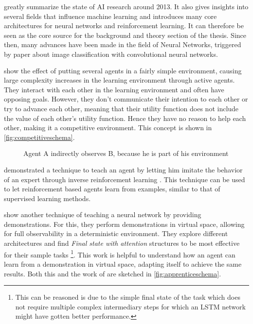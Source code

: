 \documentclass[12pt,a4paper]{article}
\begin{document}
\citeauthor{russell2016artificial} greatly summarize the state of AI research around 2013. It also gives insights into several fields that influence machine learning and introduces many core architectures for neural networks and reinforcement learning. It can therefore be seen as the core source for the background and theory section of the thesis. Since then, many advances have been made in the field of Neural Networks, triggered by \citeauthor{krizhevsky2012imagenet} paper about image classification with convolutional neural networks.

\citeauthor{bansal2017emergent} show the effect of putting several agents in a fairly simple environment, causing large complexity increases in the learning environment through active agents. They interact with each other in the learning environment and often have opposing goals. However, they don't communicate their intention to each other or try to advance each other, meaning that their utility function does not include the value of each other's utility function. Hence they have no reason to help each other, making it a competitive environment. This concept is shown in \autoref{fig:competitiveschema}.

\begin{figure}[H]
    \centering
    \caption{Agent A indirectly observes B, because he is part of his environment}
    \label{fig:competitiveschema}
\end{figure}



\citeauthor{NG2004Apprentice} demonstrated a technique to teach an agent by letting him imitate the behavior of an expert through inverse reinforcement learning \cite{NG2000InvReinf}. This technique can be used to let reinforcement based agents learn from examples, similar to that of supervised learning methods.



\citeauthor{duan2017one} show another technique of teaching a neural network by providing demonstrations. For this, they perform demonstrations in virtual space, allowing for full observability in a deterministic environment. They explore different architectures and find \emph{Final state with attention} structures to be most effective for their sample tasks
\footnote{This can be reasoned is due to the simple final state of the task which does not require multiple complex intermediary steps for which an LSTM network might have gotten better performance.}.
This work is helpful to understand how an agent can learn from a demonstration in virtual space, adapting itself to achieve the same results. Both this and the work of \citeauthor{NG2004Apprentice} are sketched in \autoref{fig:apprenticeschema}.
\end{document}
